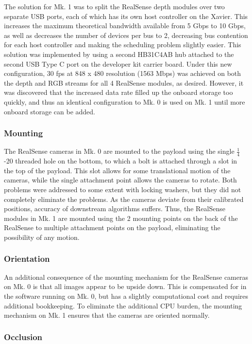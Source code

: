The solution for Mk. 1 was to split the RealSense depth modules over two separate USB ports, each of which has its own host controller on the Xavier. This increases the maximum theoretical bandwidth available from 5 Gbps to 10 Gbps, as well as decreases the number of devices per bus to 2, decreasing bus contention for each host controller and making the scheduling problem slightly easier. This solution was implemented by using a second HB31C4AB hub attached to the second USB Type C port on the developer kit carrier board. Under this new configuration, 30 fps at 848 x 480 resolution (1563 Mbps) was achieved on both the depth and RGB streams for all 4 RealSense modules, as desired. However, it was discovered that the increased data rate filled up the onboard storage too quickly, and thus an identical configuration to Mk. 0 is used on Mk. 1 until more onboard storage can be added.

\subsubsection{Mounting}

The RealSense cameras in Mk. 0 are mounted to the payload using the single $\frac{1}{4}$-20 threaded hole on the bottom, to which a bolt is attached through a slot in the top of the payload. This slot allows for some translational motion of the cameras, while the single attachment point allows the cameras to rotate. Both problems were addressed to some extent with locking washers, but they did not completely eliminate the problems. As the cameras deviate from their calibrated positions, accuracy of downstream algorithms suffers. Thus, the RealSense modules in Mk. 1 are mounted using the 2 mounting points on the back of the RealSense to multiple attachment points on the payload, eliminating the possibility of any motion.

\subsubsection{Orientation}

An additional consequence of the mounting mechanism for the RealSense cameras on Mk. 0 is that all images appear to be upside down. This is compensated for in the software running on Mk. 0, but has a slightly computational cost and requires additional bookkeeping. To eliminate the additional CPU burden, the mounting mechanism on Mk. 1 ensures that the cameras are oriented normally.

\subsubsection{Occlusion}

